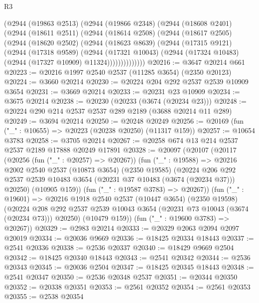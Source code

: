 \begin{lexlean}{R3}
\begin{coremodule}
      (@2944
        (@19863 @2513)
        (@2944
          (@19866 @2348)
          (@2944
            (@18608 @2401)
            (@2944
              (@18611 @2511)
              (@2944
                (@18614 @2508)
                (@2944
                  (@18617 @2505)
                  (@2944
                    (@18620 @2502)
                    (@2944
                      (@18623 @8639)
                      (@2944
                        (@17315 @9121)
                        (@2944
                          (@17318 @9589)
                          (@2944
                            (@17321 @10043)
                            (@2944 (@17324 @10483) (@2944 (@17327 @10909) @11324))))))))))))))
@20216 := @3647 @20214 @661
@20223 := @20216 @1997 @2540 @2537 (@11285 @3654) (@2350 @20123)
@20224 := @3660 @20214
@20230 := @20224 @204 @292 @2537 @2539 @10909 @3654
@20231 := @3669 @20214
@20233 := @20231 @23 @10909
@20234 := @3675 @20214
@20238 := @20230 (@20233 (@3674 (@20234 @23)))
@20248 := @20224 @290 @214 @2537 @2537 @289 @2189 (@3688 @20214 @11 @289)
@20249 := @3694 @20214
@20250 := @20248 @20249
@20256 := @20169 (fun ("_" : @10655) => @20223 (@20238 @20250) (@11317 @159))
@20257 := @10654 @3783
@20258 := @3705 @20214
@20267 := @20258 @674 @13 @214 @2537 @2537 @2189 @17888 @20249 @17891
@20328 := @20097
    (@20107
      (@20117
        (@20256 (fun ("_" : @20257) => @20267))
        (fun ("_" : @19588) =>
        @20216
          @2002
          @2540
          @2537
          (@10873 @3654)
          (@2350 @19585)
          (@20224
            @206
            @292
            @2537
            @2539
            @10483
            @3654
            (@20231 @37 @10483 (@3674 (@20234 @37)))
            @20250)
          (@10905 @159))
        (fun ("_" : @19587 @3783) => @20267))
      (fun ("_" : @19601) =>
      @20216
        @1918
        @2540
        @2537
        (@10447 @3654)
        (@2350 @19598)
        (@20224 @208 @292 @2537 @2539 @10043 @3654 (@20231 @73 @10043 (@3674 (@20234 @73))) @20250)
        (@10479 @159))
      (fun ("_" : @19600 @3783) => @20267))
@20329 := @2983 @20214
@20333 := @20329 @2063 @2094 @2097 @20019
@20334 := @20036 @9669
@20336 := @18425 @20334 @18443
@20337 := @2541 @20336
@20338 := @2536 @20337
@20340 := @18429 @9669 @2504
@20342 := @18425 @20340 @18443
@20343 := @2541 @20342
@20344 := @2536 @20343
@20345 := @20036 @2504
@20347 := @18425 @20345 @18443
@20348 := @2541 @20347
@20350 := @2536 @20348 @2537
@20351 := @20344 @20350
@20352 := @20338 @20351
@20353 := @2561 @20352
@20354 := @2561 @20353
@20355 := @2538 @20354

\end{coremodule}
\end{lexlean}
